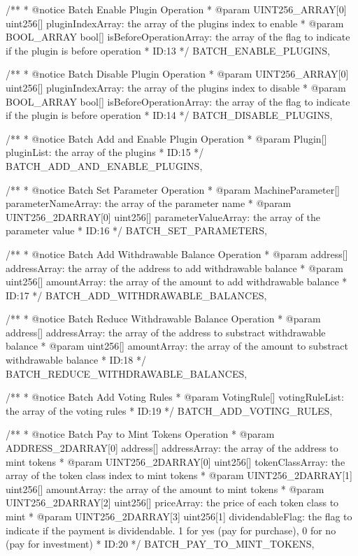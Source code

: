 \documentclass[main.tex]{subfiles}
\begin{document}
\begin{spverbatim}
  /**
   * @notice Batch Enable Plugin Operation
   * @param UINT256_ARRAY[0] uint256[] pluginIndexArray: the array of the plugins index to enable
   * @param BOOL_ARRAY bool[] isBeforeOperationArray: the array of the flag to indicate if the plugin is before operation
   * ID:13
   */
  BATCH_ENABLE_PLUGINS,

  /**
   * @notice Batch Disable Plugin Operation
   * @param UINT256_ARRAY[0] uint256[] pluginIndexArray: the array of the plugins index to disable
   * @param BOOL_ARRAY bool[] isBeforeOperationArray: the array of the flag to indicate if the plugin is before operation
   * ID:14
   */
  BATCH_DISABLE_PLUGINS,

  /**
   * @notice Batch Add and Enable Plugin Operation
   * @param Plugin[] pluginList: the array of the plugins
   * ID:15
   */
  BATCH_ADD_AND_ENABLE_PLUGINS,

  /**
   * @notice Batch Set Parameter Operation
   * @param MachineParameter[] parameterNameArray: the array of the parameter name
   * @param UINT256_2DARRAY[0] uint256[] parameterValueArray: the array of the parameter value
   * ID:16
   */
  BATCH_SET_PARAMETERS,

  /**
   * @notice Batch Add Withdrawable Balance Operation
   * @param address[] addressArray: the array of the address to add withdrawable balance
   * @param uint256[] amountArray: the array of the amount to add withdrawable balance
   * ID:17
   */
  BATCH_ADD_WITHDRAWABLE_BALANCES,

  /**
   * @notice Batch Reduce Withdrawable Balance Operation
   * @param address[] addressArray: the array of the address to substract withdrawable balance
   * @param uint256[] amountArray: the array of the amount to substract withdrawable balance
   * ID:18
   */
  BATCH_REDUCE_WITHDRAWABLE_BALANCES,

  /**
   * @notice Batch Add Voting Rules
   * @param VotingRule[] votingRuleList: the array of the voting rules
   * ID:19
   */
  BATCH_ADD_VOTING_RULES,


  /**
   * @notice Batch Pay to Mint Tokens Operation
   * @param ADDRESS_2DARRAY[0] address[] addressArray: the array of the address to mint tokens
   * @param UINT256_2DARRAY[0] uint256[] tokenClassArray: the array of the token class index to mint tokens
   * @param UINT256_2DARRAY[1] uint256[] amountArray: the array of the amount to mint tokens
   * @param UINT256_2DARRAY[2] uint256[] priceArray: the price of each token class to mint
   * @param UINT256_2DARRAY[3] uint256[1] dividendableFlag: the flag to indicate if the payment is dividendable. 1 for yes (pay for purchase), 0 for no (pay for investment)
   * ID:20
   */
  BATCH_PAY_TO_MINT_TOKENS,


\end{spverbatim}
\end{document}
